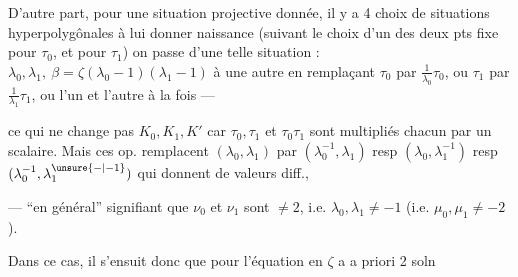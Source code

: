 D'autre part, pour une situation projective donnée, il y a 4 choix de situations hyperpolygônales à lui donner naissance (suivant le choix d'un des deux pts fixe pour $\tau_0$, et pour $\tau_1$) on passe d'une telle situation  : $\lambda_0,\lambda_1,\ \beta=\zeta(\lambda_0-1)(\lambda_1-1)$ à une autre en remplaçant $\tau_0$ par $\frac{1}{\lambda_0}\tau_0$, ou $\tau_1$ par $\frac{1}{\lambda_1}\tau_1$, ou l'un et l'autre à la fois ---

ce qui ne change pas $K_0,K_1,K'$ car $\tau_0,\tau_1$ et $\tau_0\tau_1$ sont multipliés chacun par un scalaire.  Mais ces op. remplacent $(\lambda_0,\lambda_1)$ par $(\lambda_0^{-1},\lambda_1)$ resp $(\lambda_0,\lambda_1^{-1})$ resp $(\lambda_0^{-1},\lambda_1^{\unsure{-|-1}})$ qui  donnent   de valeurs diff.,

--- ``en général'' signifiant que $\nu_0$ et $\nu_1$ sont $\ne2$, i.e. $\lambda_0,\lambda_1\ne-1$ (i.e. $\mu_0,\mu_1\ne-2$).

Dans ce cas, il s'ensuit donc que pour    l'équation en $\zeta$ a a priori 2 soln
